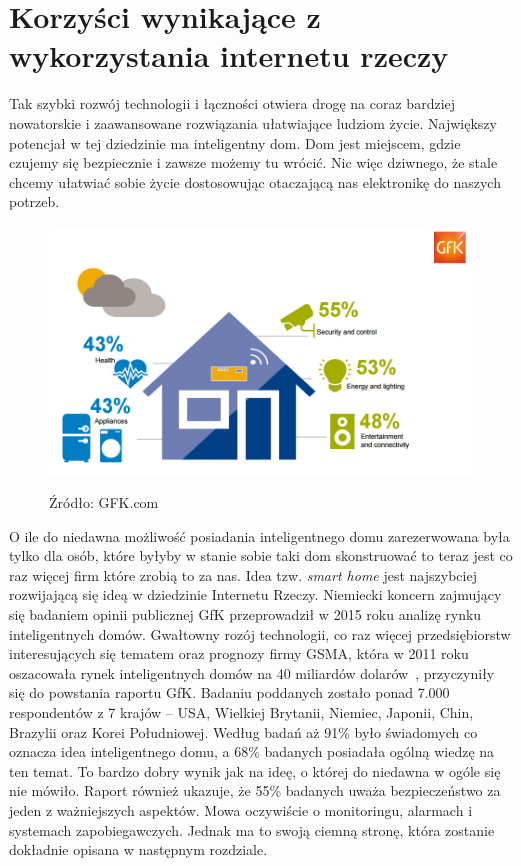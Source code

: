 \documentclass[brudnopis]{xmgr}
\begin{document}
\section{Korzyści wynikające z wykorzystania internetu rzeczy}
Tak szybki rozwój technologii i łączności otwiera drogę na coraz bardziej nowatorskie i zaawansowane rozwiązania ułatwiające ludziom życie. Największy potencjał w tej dziedzinie ma inteligentny dom. Dom jest miejscem, gdzie czujemy się bezpiecznie i zawsze możemy tu wrócić. Nic więc dziwnego, że stale chcemy ułatwiać sobie życie dostosowując otaczającą nas elektronikę do naszych potrzeb.
\begin{figure}[h]
\centering
\includegraphics[width=\textwidth]{m_percent}
\label{fig:gfk}
\caption{Źródło: GFK.com}
\end{figure} 
O ile do niedawna możliwość posiadania inteligentnego domu zarezerwowana była tylko dla osób, które byłyby w stanie sobie taki dom skonstruować to teraz jest co raz więcej firm które zrobią to za nas. Idea tzw. \emph{smart home} jest najszybciej rozwijającą się ideą w dziedzinie Internetu Rzeczy. Niemiecki koncern zajmujący się badaniem opinii publicznej GfK przeprowadził w 2015 roku analizę rynku inteligentnych domów. Gwałtowny rozój technologii, co raz więcej przedsiębiorstw interesujących się tematem oraz prognozy firmy GSMA, która w 2011 roku oszacowała rynek inteligentnych domów na 40 miliardów dolarów~\cite{Gsma:2011:CMC}, przyczyniły się do powstania raportu GfK. Badaniu poddanych zostało ponad 7.000 respondentów z 7 krajów – USA, Wielkiej Brytanii, Niemiec, Japonii, Chin, Brazylii oraz Korei Południowej. Według badań aż 91\% było świadomych co oznacza idea inteligentnego domu, a 68\% badanych posiadała ogólną wiedzę na ten temat. To bardzo dobry wynik jak na ideę, o której do niedawna w ogóle się nie mówiło.
Raport również ukazuje, że 55\% badanych uważa bezpieczeństwo za jeden z ważniejszych aspektów. Mowa oczywiście o monitoringu, alarmach i systemach zapobiegawczych. Jednak ma to swoją ciemną stronę, która zostanie dokładnie opisana w następnym rozdziale.~\cite{Gfk:2015:CMC}
\end{document}
